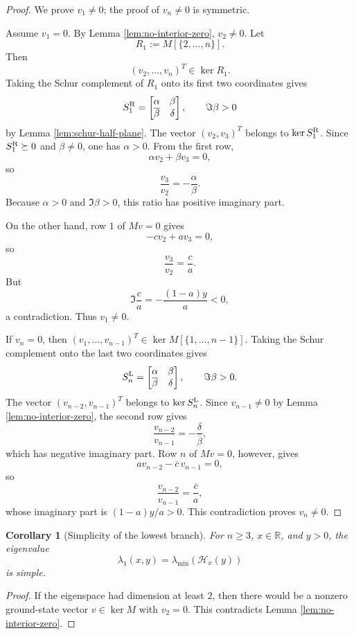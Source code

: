 \documentclass[11pt]{amsart}
\numberwithin{equation}{section}
\newcommand{\R}{\mathbb R}
\newtheorem{corollary}[theorem]{Corollary}
\begin{document}
\begin{proof}
We prove \(v_1\ne0\); the proof of \(v_n\ne0\) is symmetric.

Assume \(v_1=0\).  By Lemma \ref{lem:no-interior-zero}, \(v_2\ne0\).  Let
\[
R_1:=M[\{2,\dots,n\}].
\]
Then
\[
(v_2,\dots,v_n)^T\in\ker R_1.
\]
Taking the Schur complement of \(R_1\) onto its first two coordinates gives
\[
S_1^{\rm R}
=
\begin{bmatrix}
\alpha & \beta\\
\overline\beta & \delta
\end{bmatrix},
\qquad
\Im\beta>0
\]
by Lemma \ref{lem:schur-half-plane}.  The vector \((v_2,v_3)^T\) belongs to \(\ker S_1^{\rm R}\).  Since \(S_1^{\rm R}\succeq0\) and \(\beta\ne0\), one has \(\alpha>0\).  From the first row,
\[
\alpha v_2+\beta v_3=0,
\]
so
\[
\frac{v_3}{v_2}=-\frac{\alpha}{\beta}.
\]
Because \(\alpha>0\) and \(\Im\beta>0\), this ratio has positive imaginary part.

On the other hand, row \(1\) of \(Mv=0\) gives
\[
-cv_2+av_3=0,
\]
so
\[
\frac{v_3}{v_2}=\frac{c}{a}.
\]
But
\[
\Im\frac{c}{a}
=
-\frac{(1-a)y}{a}<0,
\]
a contradiction.  Thus \(v_1\ne0\).

If \(v_n=0\), then \((v_1,\dots,v_{n-1})^T\in\ker M[\{1,\dots,n-1\}]\).  Taking the Schur complement onto the last two coordinates gives
\[
S_n^{\rm L}
=
\begin{bmatrix}
\alpha & \beta\\
\overline\beta & \delta
\end{bmatrix},
\qquad
\Im\beta>0.
\]
The vector \((v_{n-2},v_{n-1})^T\) belongs to \(\ker S_n^{\rm L}\).  Since \(v_{n-1}\ne0\) by Lemma \ref{lem:no-interior-zero}, the second row gives
\[
\frac{v_{n-2}}{v_{n-1}}
=
-\frac{\delta}{\overline\beta},
\]
which has negative imaginary part.  Row \(n\) of \(Mv=0\), however, gives
\[
av_{n-2}-\overline c\,v_{n-1}=0,
\]
so
\[
\frac{v_{n-2}}{v_{n-1}}
=
\frac{\overline c}{a},
\]
whose imaginary part is \((1-a)y/a>0\).  This contradiction proves \(v_n\ne0\).
\end{proof}

\begin{corollary}[Simplicity of the lowest branch]\label{cor:lowest-simple}
For \(n\ge3\), \(x\in\R\), and \(y>0\), the eigenvalue
\[
\lambda_1(x,y)=\lambda_{\min}(\mathcal H_x(y))
\]
is simple.
\end{corollary}

\begin{proof}
If the eigenspace had dimension at least \(2\), then there would be a nonzero ground-state vector \(v\in\ker M\) with \(v_2=0\).  This contradicts Lemma \ref{lem:no-interior-zero}.
\end{proof}
\end{document}
